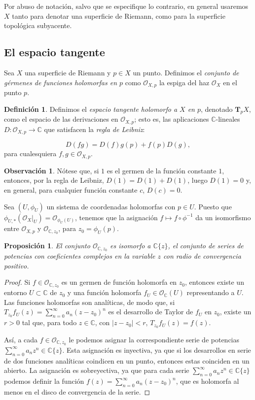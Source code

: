 \documentclass[autocontact]{gaceta}
\newtheorem{prop}[thm]{Proposición}
\theoremstyle{definition} \newtheorem{defn}[thm]{Definición}
\theoremstyle{definition} \newtheorem{ejemplo}[thm]{Ejemplo}
\theoremstyle{definition} \newtheorem{ejercicio}[thm]{Ejercicio}
\newtheorem{obs}[thm]{Observación}
\def\CC{\mathbb{C}}
\def\OO{\mathscr{O}}
\begin{document}
Por abuso de notación, salvo que se especifique lo contrario, en general usaremos $X$ tanto para denotar una superficie de Riemann, como para la superficie topológica subyacente.

\subsection{El espacio tangente}
Sea $X$ una superficie de Riemann y $p\in X$ un punto. Definimos el \emph{conjunto de gérmenes de funciones holomorfas en $p$} como $\OO_{X,p}$ la espiga del haz $\OO_X$ en el punto $p$.

\begin{defn}
  Definimos el \emph{espacio tangente holomorfo a $X$ en $p$}, denotado $\mathbf{T}_pX$, como el espacio de las derivaciones en $\OO_{X,p}$; esto es, las aplicaciones $\CC$-lineales $D:\OO_{X,p}\rightarrow \CC$ que satisfacen la \emph{regla de Leibniz}:

  \begin{equation*}
    D(fg)=D(f)g(p) + f(p) D(g),
  \end{equation*}
  para cualesquiera $f,g \in \OO_{X,p}$. 
\end{defn}

\begin{obs}
 Nótese que, si $1$ es el germen de la función constante $1$, entonces, por la regla de Leibniz, $D(1)= D(1) + D(1)$, luego $D(1)=0$ y, en general, para cualquier función constante $c$, $D(c)=0$.
\end{obs}

Sea $(U,\phi_U)$ un sistema de coordenadas holomorfas con $p\in U$. Puesto que $\phi_{U,*}(\OO_X|_U)= \OO_{\phi_U(U)}$, tenemos que la asignación $f\mapsto f\circ \phi^{-1}$ da un isomorfismo entre $\OO_{X,p}$ y $\OO_{\CC,z_0}$, para $z_0=\phi_U(p)$.

\begin{prop}
  El conjunto $\OO_{\CC,z_0}$ es isomorfo a $\CC\{z\}$, el conjunto de series de potencias con coeficientes complejos en la variable $z$ con radio de convergencia positivo.
\end{prop}

\begin{proof}
  Si $f\in \OO_{\CC,z_0}$ es un germen de función holomorfa en $z_0$, entonces existe un entorno $U\subset \CC$ de $z_0$ y una función holomorfa $f_U\in \OO_{\CC}(U)$ representando a $U$. Las funciones holomorfas son analíticas, de modo que, si $T_{z_0} f_U (z) = \sum_{n=0}^\infty a_n (z-z_0)^n$ es el desarrollo de Taylor de $f_U$ en $z_0$, existe un $r>0$ tal que, para todo $z \in \CC$, con $|z-z_0|<r$, $T_{z_0} f_U (z) = f(z)$.

  Así, a cada $f\in \OO_{\CC,z_0}$ le podemos asignar la correspondiente serie de potencias $\sum_{n=0}^\infty a_n z^n \in \CC\{z\}$. Esta asignación es inyectiva, ya que si los desarrollos en serie de dos funciones analíticas coindicen en un punto, entonces estas coinciden en un abierto. La asignación es sobreyectiva, ya que para cada serie $\sum_{n=0}^\infty a_n z^n \in \CC\{z\}$ podemos definir la función $f(z) = \sum_{n=0}^\infty a_n (z-z_0)^n$, que es holomorfa al menos en el disco de convergencia de la serie.
\end{proof}
\end{document}
